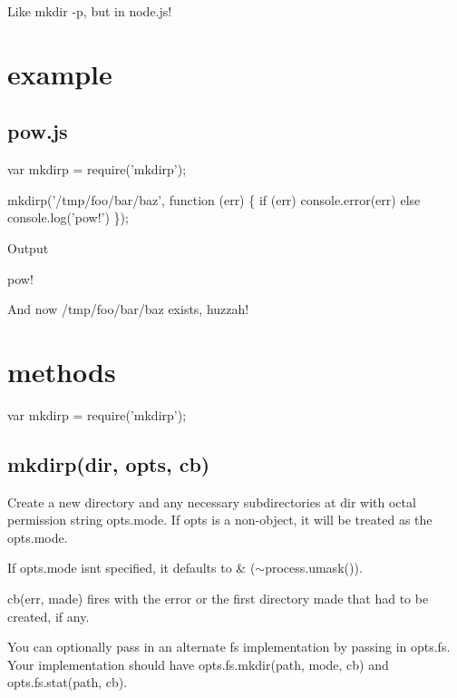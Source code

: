 Like {\ttfamily mkdir -\/p}, but in node.\+js!

\href{http://travis-ci.org/substack/node-mkdirp}{\tt }

\section*{example}

\subsection*{pow.\+js}


\begin{DoxyCode}
var mkdirp = require('mkdirp');

mkdirp('/tmp/foo/bar/baz', function (err) \{
    if (err) console.error(err)
    else console.log('pow!')
\});
\end{DoxyCode}


Output


\begin{DoxyCode}
pow!
\end{DoxyCode}


And now /tmp/foo/bar/baz exists, huzzah!

\section*{methods}


\begin{DoxyCode}
var mkdirp = require('mkdirp');
\end{DoxyCode}


\subsection*{mkdirp(dir, opts, cb)}

Create a new directory and any necessary subdirectories at {\ttfamily dir} with octal permission string {\ttfamily opts.\+mode}. If {\ttfamily opts} is a non-\/object, it will be treated as the {\ttfamily opts.\+mode}.

If {\ttfamily opts.\+mode} isn\textquotesingle{}t specified, it defaults to { \& ($\sim$process.umask())}.

{\ttfamily cb(err, made)} fires with the error or the first directory {\ttfamily made} that had to be created, if any.

You can optionally pass in an alternate {\ttfamily fs} implementation by passing in {\ttfamily opts.\+fs}. Your implementation should have {\ttfamily opts.\+fs.\+mkdir(path, mode, cb)} and {\ttfamily opts.\+fs.\+stat(path, cb)}.


